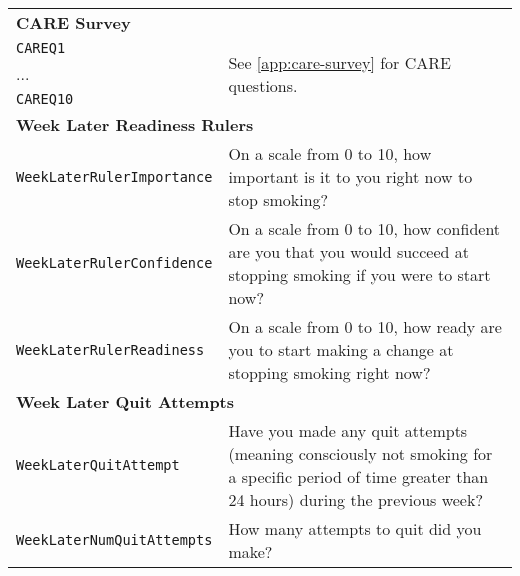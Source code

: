 \begin{longtable}{l p{10cm}}
	\multicolumn{2}{l}{\textbf{CARE Survey}}                                                                                                                                            \\
	\texttt{CAREQ1}                   & \multirow{3}{*}{See \cref{app:care-survey} for CARE questions.}                                                                                 \\
	...                               &                                                                                                                                                 \\
	\texttt{CAREQ10}                  &                                                                                                                                                 \\
	\midrule



	\multicolumn{2}{l}{\textbf{Week Later Readiness Rulers}}                                                                                                                            \\
	\texttt{WeekLaterRulerImportance} & On a scale from 0 to 10, how important is it to you right now to stop smoking?                                                                  \\
	\texttt{WeekLaterRulerConfidence} & On a scale from 0 to 10, how confident are you that you would succeed at stopping smoking if you were to start now?                             \\
	\texttt{WeekLaterRulerReadiness}  & On a scale from 0 to 10, how ready are you to start making a change at stopping smoking right now?                                              \\
	\midrule

	\multicolumn{2}{l}{\textbf{Week Later Quit Attempts}}                                                                                                                               \\
	\texttt{WeekLaterQuitAttempt}     & Have you made any quit attempts (meaning consciously not smoking for a specific period of time greater than 24 hours) during the previous week? \\
	\texttt{WeekLaterNumQuitAttempts} & How many attempts to quit did you make?                                                                                                         \\
	\midrule


\end{longtable}
